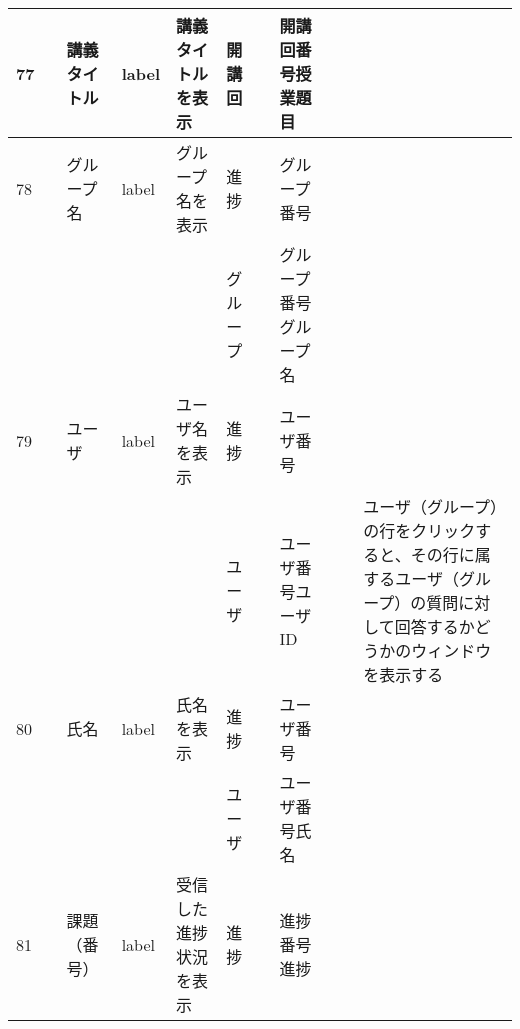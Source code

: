 \begin{table}[]
\begin{tabular}{|l|l|l|l|l|l|l|l|l|l|l|}
77  &               & 講義タイトル           & label    & 講義タイトルを表示                                                         & 開講回     &                       & 開講回番号授業題目          &                 &                               &                                                                \\ \hline
78  &               & グループ名            & label    & グループ名を表示                                                          & 進捗      &                       & グループ番号             &                 &                               &                                                                \\ \hline
    &               &                  &          &                                                                   & グループ    &                       & グループ番号グループ名        &                 &                               &                                                                \\ \hline
79  &               & ユーザ              & label    & ユーザ名を表示                                                           & 進捗      &                       & ユーザ番号              &                 &                               &                                                                \\ \hline
    &               &                  &          &                                                                   & ユーザ     &                       & ユーザ番号ユーザID         &                 &                               & ユーザ（グループ）の行をクリックすると、その行に属するユーザ（グループ）の質問に対して回答するかどうかのウィンドウを表示する \\ \hline
80  &               & 氏名               & label    & 氏名を表示                                                             & 進捗      &                       & ユーザ番号              &                 &                               &                                                                \\ \hline
    &               &                  &          &                                                                   & ユーザ     &                       & ユーザ番号氏名            &                 &                               &                                                                \\ \hline
81  &               & 課題（番号）           & label    & 受信した進捗状況を表示                                                       & 進捗      &                       & 進捗番号進捗             &                 &                               &                                                                \\ \hline

\end{tabular}
\end{table}
